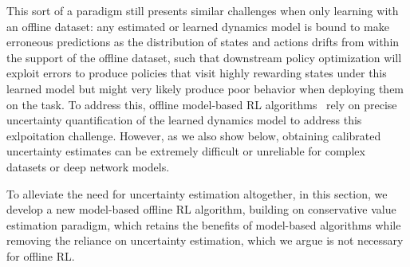 \documentclass[../thesis.tex]{subfiles}
\begin{document}
This sort of a paradigm still presents similar challenges when only learning with an offline dataset: any estimated or learned dynamics model is bound to make erroneous predictions as the distribution of states and actions drifts from within the support of the offline dataset, such that downstream policy optimization will exploit errors to produce policies that visit highly rewarding states under this learned model but might very likely produce poor behavior when deploying them on the task. To address this, offline model-based RL algorithms~\cite{kidambi2020morel, yu2020mopo} rely on precise uncertainty quantification of the learned dynamics model to address this exlpoitation challenge. However, as we also show below, obtaining calibrated uncertainty estimates can be extremely difficult or unreliable for complex datasets or deep network models.  

To alleviate the need for uncertainty estimation altogether, in this section, we develop a new model-based offline RL algorithm, building on conservative value estimation paradigm, which retains the benefits of model-based algorithms while removing the reliance on uncertainty estimation, which we argue is not necessary for offline RL.
\end{document}

